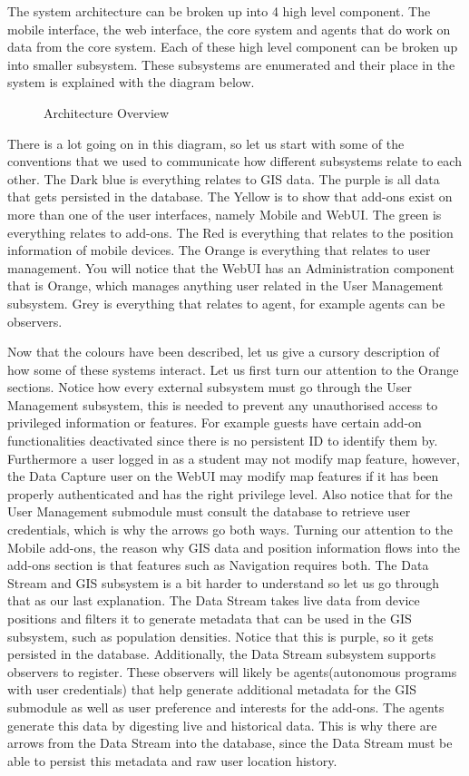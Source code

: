 The system architecture can be broken up into 4 high level component. The mobile interface, the web interface, the core system and agents that do work on data from the core system. Each of these high level component can be broken up into smaller subsystem. These subsystems are enumerated and their place in the system is explained with the diagram below.

\begin{figure}[h]
\caption{Architecture Overview}
\end{figure}
There is a lot going on in this diagram, so let us start with some of the conventions that we used to communicate how different subsystems relate to each other. The Dark blue is everything relates to GIS data. The purple is all data that gets persisted in the database. The Yellow is to show that add-ons exist on more than one of the user interfaces, namely Mobile and WebUI. The green is everything relates to add-ons. The Red is everything that relates to the position information of mobile devices. The Orange is everything that relates to user management. You will notice that the WebUI has an Administration component that is Orange, which manages anything user related in the User Management subsystem. Grey is everything that relates to agent, for example agents can be observers.\par
\bigskip
\noindent
Now that the colours have been described, let us give a cursory description of how some of these systems interact. Let us first turn our attention to the Orange sections. Notice how every external subsystem must go through the User Management subsystem, this is needed to prevent any unauthorised access to privileged information or features. For example guests have certain add-on functionalities deactivated since there is no persistent ID to identify them by. Furthermore a user logged in as a student may not modify map feature, however, the Data Capture user on the WebUI may modify map features if it has been properly authenticated and has the right privilege level. Also notice that for the User Management submodule must consult the database to retrieve user credentials, which is why the arrows go both ways. Turning our attention to the Mobile add-ons, the reason why GIS data and position information flows into the add-ons section is that features such as Navigation requires both. The Data Stream and GIS subsystem is a bit harder to understand so let us go through that as our last explanation. The Data Stream takes live data from device positions and filters it to generate metadata that can be used in the GIS subsystem, such as population densities. Notice that this is purple, so it gets persisted in the database. Additionally, the Data Stream subsystem supports observers to register. These observers will likely be agents(autonomous programs with user credentials) that help generate additional metadata for the GIS submodule as well as user preference and interests for the add-ons. The agents generate this data by digesting live and historical data. This is why there are arrows from the Data Stream into the database, since the Data Stream must be able to persist this metadata and raw user location history.
